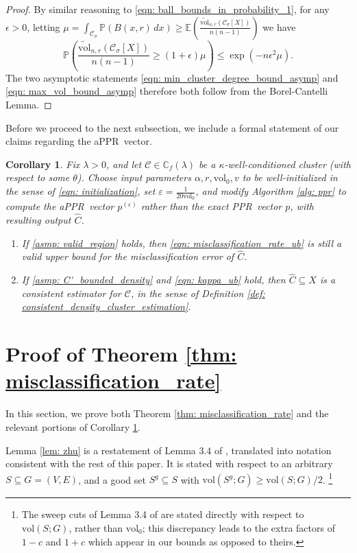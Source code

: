 \documentclass[11pt,twoside]{article}
\newtheorem{corollary}{Corollary}
\newcommand{\vol}{\mathrm{vol}}
\newcommand{\1}{\mathbf{1}}
\newcommand{\pbf}{p}        %
\newcommand{\Xbf}{X}             %
\newcommand{\Pbb}{\mathbb{P}}
\newcommand{\Cbb}{\mathbb{C}}
\newcommand{\Ebb}{\mathbb{E}}
\newcommand{\Cset}{\mathcal{C}}
\newcommand{\Csig}{\Cset_{\sigma}}
\newcommand{\Cest}{\widehat{C}}
\newcommand{\dx}{\,dx}
\newcommand{\pprspace}{{\sc PPR~}}
\begin{document}
\begin{proof}
	By similar reasoning to \eqref{eqn: ball_bounds_in_probability_1}, for any $\epsilon > 0$, letting $\mu = \int_{\Csig} \Pbb(B(x,r) \dx) \geq \Ebb\left(\frac{\widetilde{\vol}_{n,r}(\Csig[\Xbf])}{n(n-1)}\right)$ we have
	\begin{equation*}
	\Pbb\left(\frac{\widetilde{\vol}_{n,r}(\Csig[\Xbf])}{n(n-1)} \geq (1 + \epsilon)\mu \right) \leq \exp(-n\epsilon^2\mu).
	\end{equation*}
	The two asymptotic statements \eqref{eqn: min_cluster_degree_bound_asymp} and \eqref{eqn: max_vol_bound_asymp} therefore both follow from the Borel-Cantelli Lemma.
\end{proof}

Before we proceed to the next subsection, we include a formal statement of our claims regarding the a\pprspace vector. 
\begin{corollary}
	\label{cor: appr}
	Fix $\lambda > 0$, and let $\Cset \in \Cbb_f(\lambda)$ be a $\kappa$-well-conditioned cluster (with respect to some $\theta$). Choose input parameters $\alpha, r, \vol_0, v$ to be well-initialized in the sense of \eqref{eqn: initialization}, set $\varepsilon = \frac{1}{20 \vol_0}$, and modify Algorithm \ref{alg: ppr} to compute the a\pprspace vector $\pbf^{(\varepsilon)}$ rather than the exact \pprspace vector $\pbf$, with resulting output $\Cest$.
	\begin{enumerate}
		\item If \ref{asmp: valid_region} holds, then \eqref{eqn: misclassification_rate_ub} is still a valid upper bound for the misclassification error of $\Cest$.
		\item If \ref{asmp: C'_bounded_density} and \eqref{eqn: kappa_ub} hold, 
		then $\Cest \subseteq \Xbf$ is a consistent estimator for $\Cset$, in the sense of Definition \ref{def: consistent_density_cluster_estimation}.
	\end{enumerate}
\end{corollary}

\section{Proof of Theorem \ref{thm: misclassification_rate}}
\label{sec: proof_of_misclassification_rate}
In this section, we prove both Theorem \ref{thm: misclassification_rate} and the relevant portions of Corollary \ref{cor: appr}.

Lemma \ref{lem: zhu} is a restatement of Lemma 3.4 of \cite{zhu2013}, translated into notation consistent with the rest of this paper. It is stated with respect to an arbitrary $S \subseteq G = (V,E)$, and a good set $S^g \subseteq S$ with $\vol(S^g; G) \geq \vol(S; G)/2$. \footnote{The sweep cuts of Lemma 3.4 of \cite{zhu2013} are stated directly with respect to $\vol(S;G)$, rather than $\vol_0$; this discrepancy leads to the extra factors of $1 - c$ and $1 + c$ which appear in our bounds as opposed to theirs.}
\end{document}
